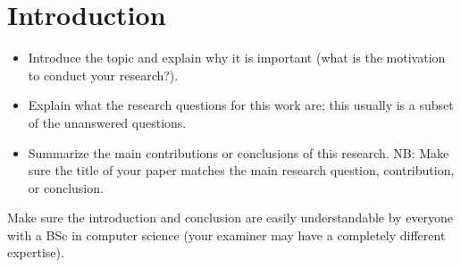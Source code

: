 \section{Introduction}
\begin{itemize}
\item Introduce the topic and explain why it is important (what is the motivation to conduct your research?).

\item Explain what the research questions for this work are; this usually is a subset of the unanswered questions.

\item Summarize the main contributions or conclusions of this research.
NB: Make sure the title of your paper matches the main research question, contribution, or conclusion.
\end{itemize}

Make sure the introduction and conclusion are easily understandable by everyone with a BSc in computer science (your examiner may have a completely different expertise).
